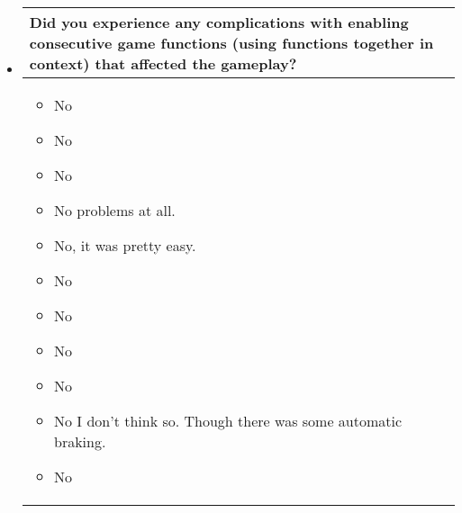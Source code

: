 \begin{itemize}
\item[]
\begin{table}[!htb]
\centering
\begin{tabular}{| p{5.5in} |}
\hline
	\cellcolor{NotSkyBlue}\textbf{Did you experience any complications with enabling consecutive game functions (using functions together in context) that affected the gameplay?}
	\\
	\hline
	\begin{itemize}
        \item No
        \item No
        \item No
        \item No problems at all.
        \item No, it was pretty easy.
        \item No
        \item No
        \item No
        \item No
        \item No I don’t think so. Though there was some automatic braking.
        \item No

	\end{itemize}
	\\
	\hline
\end{tabular}
\end{table}


\end{itemize}
